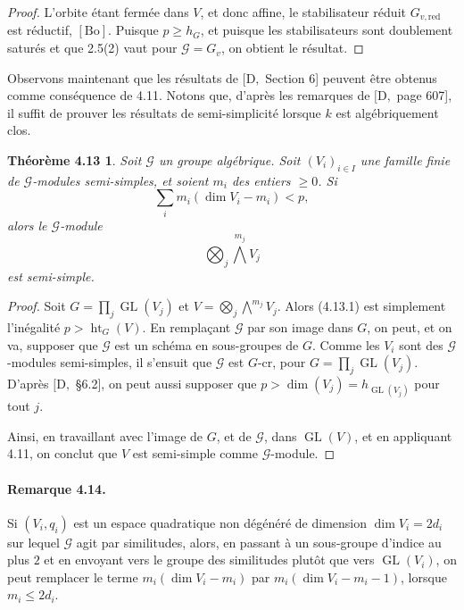 \documentclass[11pt]{article}
\newcommand{\GL}{\operatorname{GL}}
\newcommand{\red}{\mathrm{red}}
\newcommand{\htG}{\operatorname{ht}_G}
\newtheorem*{theoreme413}{Théorème 4.13}
\begin{document}
\begin{proof}
L'orbite étant fermée dans \(V\), et donc affine, le stabilisateur réduit \(G_{v,\red}\)
est réductif, \([\mathrm{Bo}]\). Puisque \(p\ge h_G\), et puisque les stabilisateurs sont
doublement saturés et que 2.5(2) vaut pour \(\mathcal G=G_v\), on obtient le résultat.
\end{proof}

Observons maintenant que les résultats de \([\mathrm D,\) Section 6] peuvent être obtenus
comme conséquence de 4.11. Notons que, d'après les remarques de \([\mathrm D,\) page 607],
il suffit de prouver les résultats de semi-simplicité lorsque \(k\) est algébriquement clos.

\begin{theoreme413}
Soit \(\mathcal G\) un groupe algébrique. Soit \((V_i)_{i\in I}\) une famille finie de
\(\mathcal G\)-modules semi-simples, et soient \(m_i\) des entiers \(\ge0\). Si
\begin{equation}
  \sum_i m_i(\dim V_i-m_i)<p,
  \tag{4.13.1}
\end{equation}
alors le \(\mathcal G\)-module
\[
  \bigotimes_j \bigwedge^{m_j}V_j
\]
est semi-simple.
\end{theoreme413}

\begin{proof}
Soit \(G=\prod_j\GL(V_j)\) et \(V=\bigotimes_j\bigwedge^{m_j}V_j\). Alors (4.13.1)
est simplement l'inégalité \(p>\htG(V)\). En remplaçant \(\mathcal G\) par son image
dans \(G\), on peut, et on va, supposer que \(\mathcal G\) est un schéma en sous-groupes
de \(G\). Comme les \(V_i\) sont des \(\mathcal G\)-modules semi-simples, il s'ensuit que
\(\mathcal G\) est \(G\)-cr, pour \(G=\prod_j\GL(V_j)\). D'après \([\mathrm D,\) \S6.2],
on peut aussi supposer que \(p>\dim(V_j)=h_{\GL(V_j)}\) pour tout \(j\).

Ainsi, en travaillant avec l'image de \(G\), et de \(\mathcal G\), dans \(\GL(V)\), et en
appliquant 4.11, on conclut que \(V\) est semi-simple comme \(\mathcal G\)-module.
\end{proof}

\paragraph{Remarque 4.14.}
Si \((V_i,q_i)\) est un espace quadratique non dégénéré de dimension \(\dim V_i=2d_i\)
sur lequel \(\mathcal G\) agit par similitudes, alors, en passant à un sous-groupe d'indice
au plus \(2\) et en envoyant vers le groupe des similitudes plutôt que vers \(\GL(V_i)\),
on peut remplacer le terme \(m_i(\dim V_i-m_i)\) par \(m_i(\dim V_i-m_i-1)\), lorsque
\(m_i\le 2d_i\).
\end{document}
